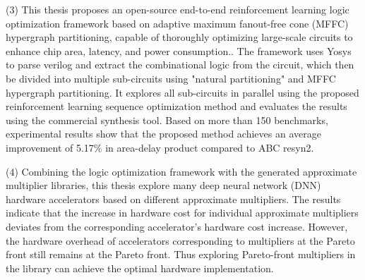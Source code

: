\begin{abstract*}
      (3) This thesis proposes an open-source end-to-end reinforcement learning logic optimization framework based on adaptive maximum fanout-free cone (MFFC) hypergraph partitioning, capable of thoroughly optimizing large-scale circuits to enhance chip area, latency, and power consumption.. The framework uses Yosys to parse verilog and extract the combinational logic from the circuit, which then be divided into multiple sub-circuits using "natural partitioning" and MFFC hypergraph partitioning. It explores all sub-circuits in parallel using the proposed reinforcement learning sequence optimization method and evaluates the results using the commercial synthesis tool. Based on more than 150 benchmarks, experimental results show that the proposed method achieves an average improvement of 5.17\% in area-delay product compared to ABC resyn2. 
      
      (4) Combining the logic optimization framework with the generated approximate multiplier libraries, this thesis explore many deep neural network (DNN) hardware accelerators based on different approximate multipliers. The results indicate that the increase in hardware cost for individual approximate multipliers deviates from the corresponding accelerator's hardware cost increase. However, the hardware overhead of accelerators corresponding to multipliers at the Pareto front still remains at the Pareto front. Thus exploring Pareto-front multipliers in the library can achieve the optimal hardware implementation.
\end{abstract*}